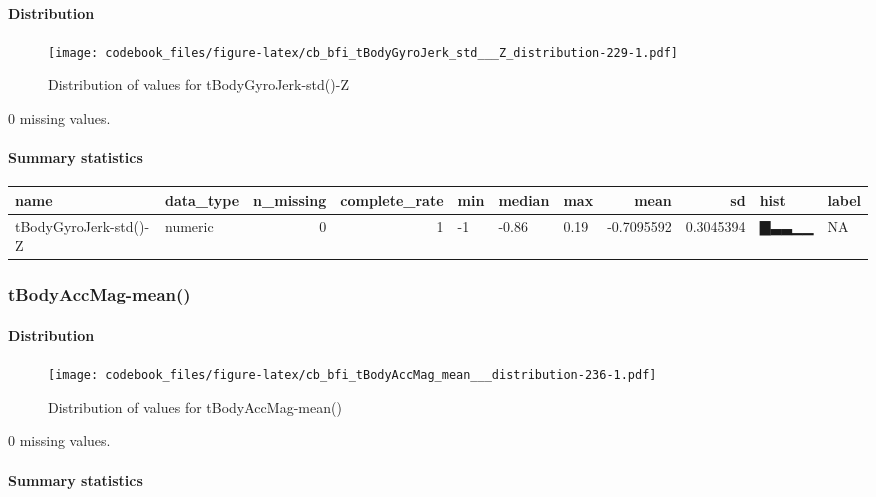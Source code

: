\documentclass[
]{article}
\begin{document}
\hypertarget{tBodyGyroJerk_std___Z_distribution}{%
\paragraph{Distribution}\label{tBodyGyroJerk_std___Z_distribution}}

\begin{figure}
\centering
\texttt{[image: codebook\_files/figure-latex/cb\_bfi\_tBodyGyroJerk\_std\_\_\_Z\_distribution-229-1.pdf]}
\caption{Distribution of values for tBodyGyroJerk-std()-Z}
\end{figure}

0 missing values.

\hypertarget{tBodyGyroJerk_std___Z_summary}{%
\paragraph{Summary statistics}\label{tBodyGyroJerk_std___Z_summary}}

\begin{longtable}[]{@{}llrrlllrrll@{}}
\toprule
name & data\_type & n\_missing & complete\_rate & min & median & max &
mean & sd & hist & label \\
\midrule
\endhead
tBodyGyroJerk-std()-Z & numeric & 0 & 1 & -1 & -0.86 & 0.19 & -0.7095592
& 0.3045394 & ▇▃▃▁▁ & NA \\
\bottomrule
\end{longtable}

\hypertarget{tBodyAccMag_mean__}{%
\subsubsection{tBodyAccMag-mean()}\label{tBodyAccMag_mean__}}

\hypertarget{tBodyAccMag_mean___distribution}{%
\paragraph{Distribution}\label{tBodyAccMag_mean___distribution}}

\begin{figure}
\centering
\texttt{[image: codebook\_files/figure-latex/cb\_bfi\_tBodyAccMag\_mean\_\_\_distribution-236-1.pdf]}
\caption{Distribution of values for tBodyAccMag-mean()}
\end{figure}

0 missing values.

\hypertarget{tBodyAccMag_mean___summary}{%
\paragraph{Summary statistics}\label{tBodyAccMag_mean___summary}}
\end{document}
